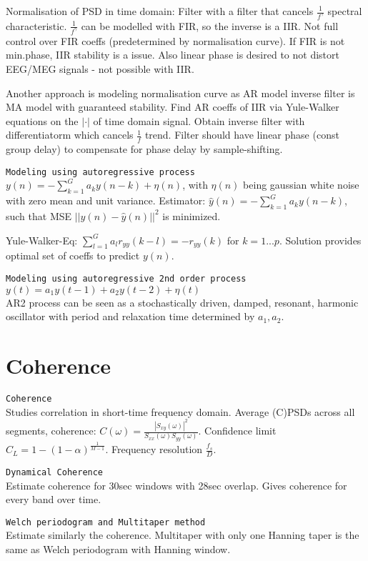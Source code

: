 Normalisation of PSD in time domain: Filter with a filter that cancels $\frac{1}{f^\gamma}$ spectral characteristic. $\frac{1}{f^\gamma}$ can be modelled with FIR, so the inverse is a IIR. Not full control over FIR coeffs (predetermined by normalisation curve). If FIR is not min.phase, IIR stability is a issue. Also linear phase is desired to not distort EEG/MEG signals - not possible with IIR.\vs

Another approach is modeling normalisation curve as AR model \arr inverse filter is MA model with guaranteed stability. Find AR coeffs of IIR via Yule-Walker equations on the $|\cdot|$ of time domain signal. Obtain inverse filter with differentiatorm which cancels $\frac{1}{f}$ trend. Filter should have linear phase (const group delay) to compensate for phase delay by sample-shifting.\vs

\verb!Modeling using autoregressive process!\\
$y(n) = -\sum_{k=1}^G a_k y(n-k) + \eta(n)$, with $\eta(n)$ being gaussian white noise with zero mean and unit variance.\vs
Estimator: $\hat{y}(n) = -\sum_{k=1}^G a_k y(n-k)$, such that MSE $||y(n)-\hat{y}(n)||^2$ is minimized.\vs

Yule-Walker-Eq: $\sum_{l=1}^G a_l r_{yy}(k-l) = -r_{yy}(k)$ for $k=1...p$. Solution provides optimal set of coeffs to predict $y(n)$.\vs

\verb!Modeling using autoregressive 2nd order process!\\
$y(t) = a_1y(t-1)+a_2y(t-2)+\eta(t)$\\
AR2 process can be seen as a stochastically driven, damped, resonant, harmonic oscillator with period and relaxation time determined by $a_1, a_2$.

\section{Coherence}
\verb!Coherence!\\
Studies correlation in short-time frequency domain. Average (C)PSDs across all segments, coherence: $C(\omega)=\frac{|S_{xy}(\omega)|^2}{S_{xx}(\omega)S_{yy}(\omega)}$. Confidence limit $C_L=1-(1-\alpha)^{\frac{1}{M-1}}$. Frequency resolution $\frac{f_s}{D}$.\vs

\verb!Dynamical Coherence!\\
Estimate coherence for 30sec windows with 28sec overlap. Gives coherence for every band over time.\vs

\verb!Welch periodogram and Multitaper method!\\
Estimate similarly the coherence. Multitaper with only one Hanning taper is the same as Welch periodogram with Hanning window.\vs

